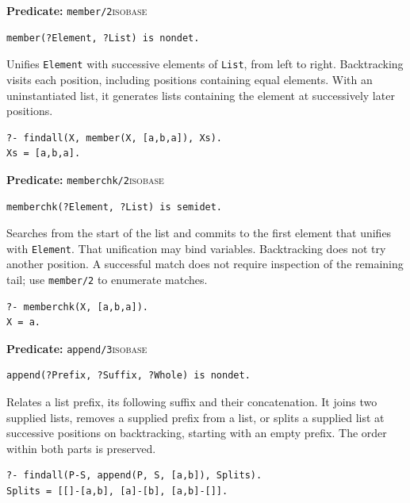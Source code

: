 \par{}
\noindent \textbf{Predicate:} \texttt{member/2}\hfill\textsc{isobase}
\begin{verbatim}
member(?Element, ?List) is nondet.
\end{verbatim}
\noindent Unifies \texttt{Element} with successive elements of \texttt{List},
from left to right. Backtracking visits each position, including positions
containing equal elements. With an uninstantiated list, it generates lists
containing the element at successively later positions.
\begin{verbatim}
?- findall(X, member(X, [a,b,a]), Xs).
Xs = [a,b,a].
\end{verbatim}

\par{}
\noindent \textbf{Predicate:} \texttt{memberchk/2}\hfill\textsc{isobase}
\begin{verbatim}
memberchk(?Element, ?List) is semidet.
\end{verbatim}
\noindent Searches from the start of the list and commits to the first element
that unifies with \texttt{Element}. That unification may bind variables.
Backtracking does not try another position. A successful match does not require
inspection of the remaining tail; use \texttt{member/2} to enumerate matches.
\begin{verbatim}
?- memberchk(X, [a,b,a]).
X = a.
\end{verbatim}

\par{}
\noindent \textbf{Predicate:} \texttt{append/3}\hfill\textsc{isobase}
\begin{verbatim}
append(?Prefix, ?Suffix, ?Whole) is nondet.
\end{verbatim}
\noindent Relates a list prefix, its following suffix and their concatenation.
It joins two supplied lists, removes a supplied prefix from a list, or splits a
supplied list at successive positions on backtracking, starting with an empty
prefix. The order within both parts is preserved.
\begin{verbatim}
?- findall(P-S, append(P, S, [a,b]), Splits).
Splits = [[]-[a,b], [a]-[b], [a,b]-[]].
\end{verbatim}

